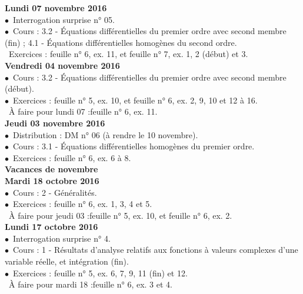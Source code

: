 \documentclass[12pt,a4paper]{article}
\begin{document}
\noindent\textbf{ Lundi 07 novembre 2016 } \\
$\bullet$\ Interrogation surprise n° 05.\\
$\bullet$\ Cours : 3.2 - Équations différentielles du premier ordre avec second membre (fin) ; 4.1 - Équations 
différentielles homogènes du second ordre.\\
\bu\ Exercices : feuille n° 6, ex. 11, et feuille n° 7, ex. 1, 2 (début) et 3.\vspace{.4cm}\\

\noindent\textbf{Vendredi 04 novembre 2016 }\\
$\bullet$\ Cours : 3.2 - Équations différentielles du premier ordre avec 
second membre (début).\\
$\bullet$\ Exercices : feuille n° 5, ex. 10, et feuille n° 6, ex. 2, 9, 10 et 12 à 16.\\
\bu\ À faire pour lundi 07 :feuille n° 6, ex. 11.\vspace{.4cm}\\

\noindent\textbf{Jeudi 03 novembre 2016 }\\
$\bullet$\ Distribution : DM n° 06 (à rendre le 10 novembre).\\
$\bullet$\ Cours : 3.1 - Équations différentielles homogènes du premier ordre.\\
$\bullet$\ Exercices : feuille n° 6, ex. 6 à 8.\vspace{.4cm}\\

\noindent\textbf{ Vacances de novembre }\vspace{.4cm}\\

\noindent\textbf{\bf Mardi 18 octobre 2016 }\\
$\bullet$\ Cours : 2 - Généralités.\\
$\bullet$\ Exercices : feuille n° 6, ex. 1, 3, 4 et 5.\\
\bu\ À faire pour jeudi 03 :feuille n° 5, ex. 10, et feuille n° 6, ex. 2.\vspace{.4cm}\\

\noindent\textbf{Lundi 17 octobre 2016 }\\
$\bullet$\ Interrogation surprise n° 4.\\
$\bullet$\ Cours : 1 - Résultats d'analyse relatifs aux fonctions à valeurs complexes d'une variable réelle, et 
intégration (fin).\\
$\bullet$\ Exercices : feuille n° 5, ex. 6, 7, 9, 11 (fin) et 12.\\
\bu\ À faire pour mardi 18 :feuille n° 6, ex. 3 et 4.\vspace{.4cm}\\
   
\end{document}
